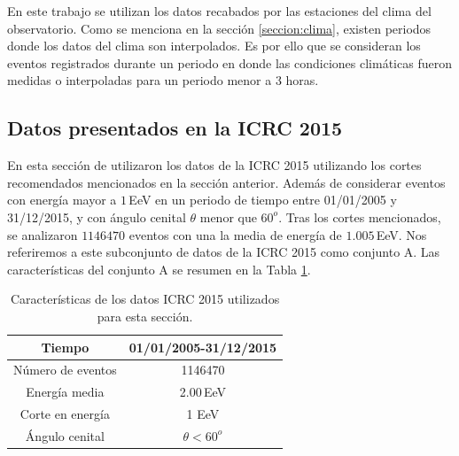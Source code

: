 En este trabajo se utilizan los datos recabados por las estaciones del clima del observatorio. Como se menciona en la sección \ref{seccion:clima}, existen periodos donde los datos del clima son interpolados. Es por ello que se consideran los eventos registrados durante un periodo en donde las condiciones climáticas fueron medidas o interpoladas para un periodo menor a 3 horas. %

\subsection{Datos presentados en la ICRC 2015}\label{icrc2015}
En esta sección de utilizaron los datos de la ICRC 2015 utilizando los cortes recomendados mencionados en la sección anterior. Además de considerar eventos con energía mayor a $1\,$EeV en un periodo de tiempo entre 01/01/2005 y 31/12/2015, y con ángulo cenital $\theta$ menor que $60^o$.  Tras los cortes mencionados, se analizaron $1146470$ eventos con una la media de energía de $1.005\,$EeV. Nos referiremos a este subconjunto de datos de la ICRC 2015  como conjunto A. Las características del conjunto A se resumen en la Tabla \ref{tabla:caracteristicas_ICRC_2015}.
        \begin{table}[H]
            \centering
            \begin{tabular}{|c|c|}
            \hline
            \textbf{Tiempo}     & \textbf{01/01/2005-31/12/2015} \\ \hline
            Número de eventos   &   1146470							\\ \hline 
            Energía media       &   2.00\,EeV       				\\ \hline  %
            Corte en energía    &  1 EeV        				\\ \hline 
            Ángulo cenital		& $\theta < 60^o$ 				\\ \hline
            \end{tabular}
        \caption{Características de los datos ICRC 2015 utilizados para esta sección.} \label{tabla:caracteristicas_ICRC_2015}
        \end{table}

